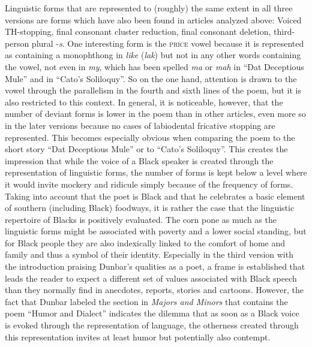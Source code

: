 Linguistic forms that are represented to (roughly) the same extent in all three versions are forms which have also been found in articles analyzed above: Voiced TH-stopping, final consonant cluster reduction, final consonant deletion, third-person plural -\emph{s}. One interesting form is the \textsc{price} vowel because it is represented as containing a monophthong in \emph{like} (\emph{lak}) but not in any other words containing the vowel, not even in \emph{my}, which has been spelled \emph{ma} or \emph{mah} in “Dat Deceptious Mule” and in “Cato’s Soliloquy”. So on the one hand, attention is drawn to the vowel through the parallelism in the fourth and sixth lines of the poem, but it is also restricted to this context. In general, it is noticeable, however, that the number of deviant forms is lower in the poem than in other articles, even more so in the later versions because no cases of labiodental fricative stopping are represented. This becomes especially obvious when comparing the poem to the short story “Dat Deceptious Mule” or to “Cato’s Soliloquy”. This creates the impression that while the voice of a Black speaker is created through the representation of linguistic forms, the number of forms is kept below a level where it would invite mockery and ridicule simply because of the frequency of forms. Taking into account that the poet is Black and that he celebrates a basic element of southern (including Black) foodways, it is rather the case that the linguistic repertoire of Blacks is positively evaluated. The corn pone as much as the linguistic forms might be associated with poverty and a lower social standing, but for Black people they are also indexically linked to the comfort of home and family and thus a symbol of their identity. Especially in the third version with the introduction praising Dunbar’s qualities as a poet, a frame is established that leads the reader to expect a different set of values associated with Black speech than they normally find in anecdotes, reports, stories and cartoons. However, the fact that Dunbar labeled the section in \emph{Majors and Minors} that contains the poem “Humor and Dialect” indicates the dilemma that as soon as a Black voice is evoked through the representation of language, the otherness created through this representation invites at least humor but potentially also contempt.

